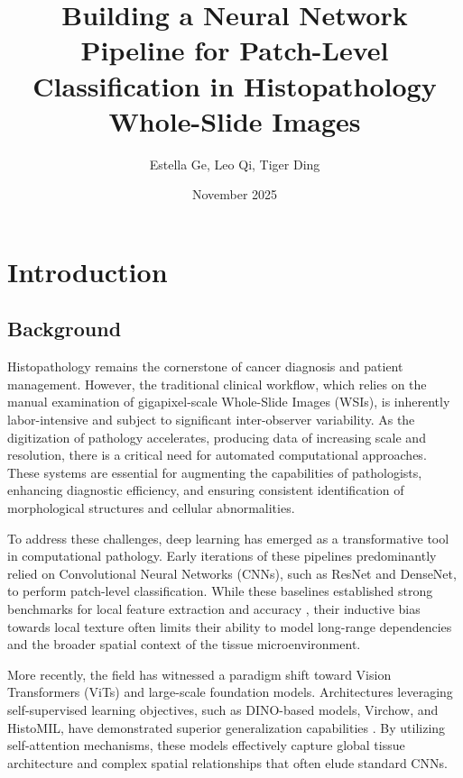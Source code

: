 \documentclass[a4paper,12pt]{article}
\title{Building a Neural Network Pipeline for Patch-Level Classification in Histopathology Whole-Slide Images}
\author{Estella Ge, Leo Qi, Tiger Ding}
\date{November 2025}
\begin{document}
\maketitle
\thispagestyle{empty}
\clearpage

\tableofcontents
\thispagestyle{empty}
\clearpage

\setcounter{page}{1}
\pagestyle{fancy}

\section{Introduction}
\subsection{Background}
Histopathology remains the cornerstone of cancer diagnosis and patient management. However, the traditional clinical workflow, which relies on the manual examination of gigapixel-scale Whole-Slide Images (WSIs), is inherently labor-intensive and subject to significant inter-observer variability. As the digitization of pathology accelerates, producing data of increasing scale and resolution, there is a critical need for automated computational approaches. These systems are essential for augmenting the capabilities of pathologists, enhancing diagnostic efficiency, and ensuring consistent identification of morphological structures and cellular abnormalities.

To address these challenges, deep learning has emerged as a transformative tool in computational pathology. Early iterations of these pipelines predominantly relied on Convolutional Neural Networks (CNNs), such as ResNet and DenseNet, to perform patch-level classification. While these baselines established strong benchmarks for local feature extraction and accuracy \cite{kather_multi-class_2016}, their inductive bias towards local texture often limits their ability to model long-range dependencies and the broader spatial context of the tissue microenvironment.

More recently, the field has witnessed a paradigm shift toward Vision Transformers (ViTs) and large-scale foundation models. Architectures leveraging self-supervised learning objectives, such as DINO-based models, Virchow, and HistoMIL, have demonstrated superior generalization capabilities \cite{caron_emerging_2021,vorontsov_virchow_2024}. By utilizing self-attention mechanisms, these models effectively capture global tissue architecture and complex spatial relationships that often elude standard CNNs.
\end{document}
